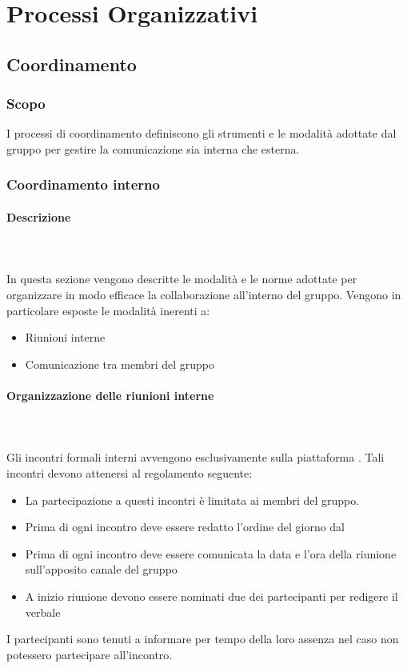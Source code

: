 \section{Processi Organizzativi}
\subsection{Coordinamento}
\subsubsection{Scopo}
I processi di coordinamento definiscono gli strumenti e le modalità adottate dal gruppo per gestire la comunicazione sia interna che esterna.
\subsubsection{Coordinamento interno}
\paragraph{Descrizione}\mbox{}\\
\mbox{}\\
In questa sezione vengono descritte le modalità e le norme adottate per organizzare in modo efficace la collaborazione all'interno del gruppo. 
Vengono in particolare esposte le modalità inerenti a:
\begin{itemize}
\item Riunioni interne
\item Comunicazione tra membri del gruppo
\end{itemize}
\paragraph{Organizzazione delle riunioni interne}\mbox{}\\
\mbox{}\\
Gli incontri formali interni avvengono esclusivamente sulla piattaforma .
Tali incontri devono attenersi al regolamento seguente:
\begin{itemize}
\item La partecipazione a questi incontri è limitata ai membri del gruppo.
\item Prima di ogni incontro deve essere redatto l'ordine del giorno dal \RdP{}
\item Prima di ogni incontro deve essere comunicata la data e l'ora della riunione sull'apposito canale  del gruppo
\item A inizio riunione devono essere nominati due dei partecipanti per redigere il verbale
\end{itemize}
I partecipanti sono tenuti a informare per tempo della loro assenza nel caso non potessero partecipare all'incontro.
